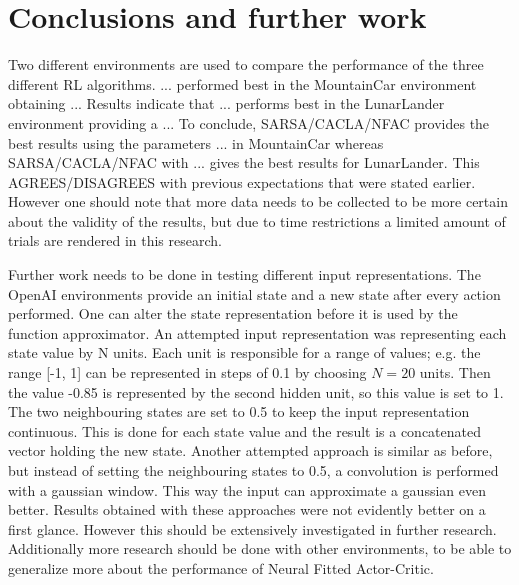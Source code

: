 
\section{Conclusions and further work}
Two different environments are used to compare the performance of the three different RL algorithms. ... performed best in the MountainCar environment obtaining ... Results indicate that ... performs best in the LunarLander environment providing a ... To conclude, SARSA/CACLA/NFAC provides the best results using the parameters ... in MountainCar whereas SARSA/CACLA/NFAC with ... gives the best results for LunarLander. This AGREES/DISAGREES with previous expectations that were stated earlier. However one should note that more data needs to be collected to be more certain about the validity of the results, but due to time restrictions a limited amount of trials are rendered in this research.  

Further work needs to be done in testing different input representations. The OpenAI environments provide an initial state and a new state after every action performed. One can alter the state representation before it is used by the function approximator. An attempted input representation was representing each state value by N units. Each unit is responsible for a range of values; e.g. the range [-1, 1] can be represented in steps of 0.1 by choosing $N=20$ units. Then the value -0.85 is represented by the second hidden unit, so this value is set to 1. The two neighbouring states are set to 0.5 to keep the input representation continuous. This is done for each state value and the result is a concatenated vector holding the new state. Another attempted approach is similar as before, but instead of setting the neighbouring states to 0.5, a convolution is performed with a gaussian window. This way the input can approximate a gaussian even better. Results obtained with these approaches were not evidently better on a first glance. However this should be extensively investigated in further research. Additionally more research should be done with other environments, to be able to generalize more about the performance of Neural Fitted Actor-Critic.

